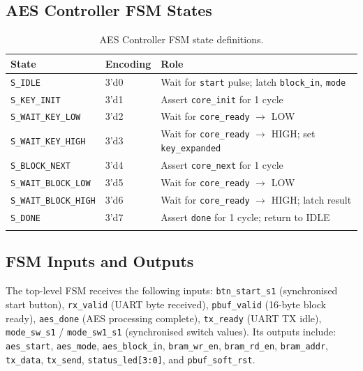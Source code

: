 \documentclass[12pt,a4paper]{article}
\begin{document}
\subsection{AES Controller FSM States}

\begin{longtable}{@{}lll@{}}
\toprule
\textbf{State} & \textbf{Encoding} & \textbf{Role} \\
\midrule
\endhead
\texttt{S\_IDLE}              & 3'd0 & Wait for \texttt{start} pulse; latch \texttt{block\_in}, \texttt{mode} \\
\texttt{S\_KEY\_INIT}         & 3'd1 & Assert \texttt{core\_init} for 1 cycle \\
\texttt{S\_WAIT\_KEY\_LOW}    & 3'd2 & Wait for \texttt{core\_ready} $\to$ LOW \\
\texttt{S\_WAIT\_KEY\_HIGH}   & 3'd3 & Wait for \texttt{core\_ready} $\to$ HIGH; set \texttt{key\_expanded} \\
\texttt{S\_BLOCK\_NEXT}       & 3'd4 & Assert \texttt{core\_next} for 1 cycle \\
\texttt{S\_WAIT\_BLOCK\_LOW}  & 3'd5 & Wait for \texttt{core\_ready} $\to$ LOW \\
\texttt{S\_WAIT\_BLOCK\_HIGH} & 3'd6 & Wait for \texttt{core\_ready} $\to$ HIGH; latch result \\
\texttt{S\_DONE}              & 3'd7 & Assert \texttt{done} for 1 cycle; return to IDLE \\
\bottomrule
\caption{AES Controller FSM state definitions.}
\label{tab:aes_states}
\end{longtable}

\subsection{FSM Inputs and Outputs}

The top-level FSM receives the following inputs: \texttt{btn\_start\_s1} (synchronised start button), \texttt{rx\_valid} (UART byte received), \texttt{pbuf\_valid} (16-byte block ready), \texttt{aes\_done} (AES processing complete), \texttt{tx\_ready} (UART TX idle), \texttt{mode\_sw\_s1} / \texttt{mode\_sw1\_s1} (synchronised switch values). Its outputs include: \texttt{aes\_start}, \texttt{aes\_mode}, \texttt{aes\_block\_in}, \texttt{bram\_wr\_en}, \texttt{bram\_rd\_en}, \texttt{bram\_addr}, \texttt{tx\_data}, \texttt{tx\_send}, \texttt{status\_led[3:0]}, and \texttt{pbuf\_soft\_rst}.


\end{document}
